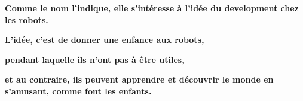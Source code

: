 \documentclass{beamer}
\begin{document}
\begin{frame}
\begin{center}
\textbf{Comme le nom l'indique, elle s'intéresse à l'idée du development chez les robots.
}
\let\thefootnote\relax{}
\end{center}
\end{frame}

\begin{frame}
\begin{center}
\textbf{L'idée, c'est de donner une enfance aux robots,
}
\let\thefootnote\relax{}
\end{center}
\end{frame}

\begin{frame}
\begin{center}
\textbf{pendant laquelle ils n'ont pas à être utiles,
}
\let\thefootnote\relax{}
\end{center}
\end{frame}

\begin{frame}
\begin{center}
\textbf{et au contraire, ils peuvent apprendre et découvrir le monde en s'amusant, comme font les enfants.
}
\let\thefootnote\relax{}
\end{center}
\end{frame}
\end{document}
